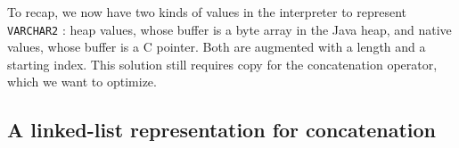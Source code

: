 \documentclass[twoside,11pt,a4paper]{article}
\newcommand{\java}[1]{\textsf{#1}}
\newcommand{\pls}[1]{\texttt{#1}}
\newcommand{\plstype}[1]{\pls{#1}}
\newcommand{\varchar}{\plstype{VARCHAR2}}
\begin{document}
To recap, we now have two kinds of values in the interpreter to represent \varchar{} : heap values, whose buffer is a \java{byte} array in the Java heap, and native values, whose buffer is a C pointer. Both are augmented with a length and a starting index. This solution still requires copy for the concatenation operator, which we want to optimize.

%
%

\subsection{A linked-list representation for concatenation}
\end{document}

